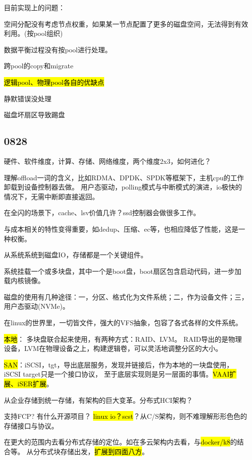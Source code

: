 目前实现上的问题：
\begin{enumbox}
\item 空间分配没有考虑节点权重，如果某一节点配置了更多的磁盘空间，无法得到有效利用。(按pool组织)
\item 数据平衡过程没有按pool进行处理。
\item 跨pool的copy和migrate
\item \hl{逻辑pool、物理pool各自的优缺点}
\item 静默错误没处理
\item 磁盘坏扇区导致踢盘
\end{enumbox}

\subsection{0828}

硬件、软件维度，计算、存储、网络维度，两个维度2x3，如何进化？

理解offload一词的含义，比如RDMA、DPDK、SPDK等框架下，主机cpu的工作卸载到设备控制器去做。
用户态驱动，polling模式与中断模式的演进，io极快的情况下，无需中断即直接返回。

在全闪的场景下，cache、lsv价值几许？ssd控制器会做很多工作。

与成本相关的特性变得重要，如dedup、压缩、ec等，也相应降低了性能，这是一种权衡。

从系统系统到磁盘IO，存储都是一个关键组件。

系统挂载一个或多块盘，其中一个是boot盘，boot扇区包含启动代码，进一步加载内核镜像。

磁盘的使用有几种途径：一，分区、格式化为文件系统；二，作为设备文件；三，用户态驱动(NVMe)。

在linux的世界里，一切皆文件，强大的VFS抽象，包容了各式各样的文件系统。

\hl{本地}： 多块盘联合起来使用，有两种方式：RAID、LVM。
RAID导出的是物理设备，LVM在物理设备之上，构建逻辑卷，可以灵活地调整分区的大小。

\hl{SAN}：iSCSI，tgt，导出底层服务，发现并链接后，作为本地的一块盘使用，iSCSI target只是一个接口协议，
至于底层实现则是另一层面的事情。\hl{VAAI扩展、iSER扩展}。

从企业存储到统一存储，有架构的巨大变革。分布式HCI架构？

支持FCP? 有什么开源项目？ \hl{linux io？scst}？从C/S架构，则不难理解形形色色的存储接口与协议。

在更大的范围内去看分布式存储的定位。如在多云架构内去看，与\hl{docker/k8}的结合等。
从分布式块存储出发，\hl{扩展到四面八方}。

